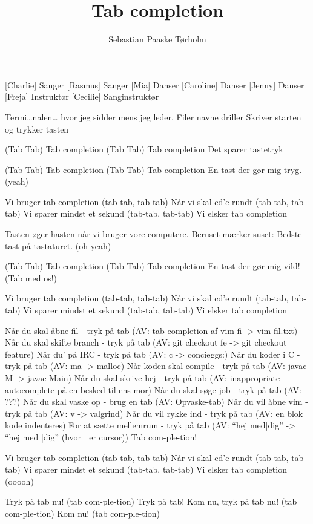 \documentclass[a4paper,11pt]{article}
\title{Tab completion}
\author{Sebastian Paaske Tørholm}
\begin{document}
\maketitle

\begin{roles}
[Charlie] Sanger
[Rasmus] Sanger
[Mia] Danser
[Caroline] Danser
[Jenny] Danser
[Freja] Instruktør
[Cecilie] Sanginstruktør
\end{roles}

\begin{song}
%
Termi{\ldots}nalen{\ldots}
hvor jeg sidder
mens jeg leder.
Filer
navne driller
Skriver starten
og trykker tasten

(Tab Tab)
Tab completion
(Tab Tab)
Tab completion
Det sparer tastetryk

(Tab Tab)
Tab completion
(Tab Tab)
Tab completion
En tast der gør mig tryg. (yeah)

Vi bruger tab completion (tab-tab, tab-tab)
Når vi skal cd'e rundt  (tab-tab, tab-tab)
Vi sparer mindst et sekund (tab-tab, tab-tab)
Vi elsker tab completion

Tasten
øger hasten
når vi bruger
vore computere.
Beruset
mærker suset:
Bedste tast på
tastaturet. (oh yeah)

(Tab Tab)
Tab completion
(Tab Tab)
Tab completion
En tast der gør mig vild! (Tab med os!)

Vi bruger tab completion (tab-tab, tab-tab)
Når vi skal cd'e rundt  (tab-tab, tab-tab)
Vi sparer mindst et sekund (tab-tab, tab-tab)
Vi elsker tab completion

Når du skal åbne fil - tryk på tab (AV: tab completion af vim fi -> vim fil.txt)
Når du skal skifte branch - tryk på tab (AV: git checkout fe -> git checkout feature)
Når du' på IRC - tryk på tab (AV: c -> concieggs:)
Når du koder i C - tryk på tab (AV: ma -> malloc)
Når koden skal compile - tryk på tab (AV: javac M -> javac Main)
Når du skal skrive hej - tryk på tab (AV: inappropriate autocomplete på en besked til ens mor)
Når du skal søge job - tryk på tab (AV: ???)
Når du skal vaske op - brug en tab (AV: Opvaske-tab)
Når du vil åbne vim - tryk på tab (AV: v -> valgrind)
Når du vil rykke ind - tryk på tab (AV: en blok kode indenteres)
For at sætte mellemrum - tryk på tab (AV: “hej med|dig” -> “hej med        |dig” (hvor | er cursor))
Tab com-ple-tion!

Vi bruger tab completion (tab-tab, tab-tab)
Når vi skal cd'e rundt  (tab-tab, tab-tab)
Vi sparer mindst et sekund (tab-tab, tab-tab)
Vi elsker tab completion (ooooh)

Tryk på tab nu! (tab com-ple-tion)
Tryk på tab!
Kom nu, tryk på tab nu! (tab com-ple-tion)
Kom nu! (tab com-ple-tion)

\end{song}
\end{document}
